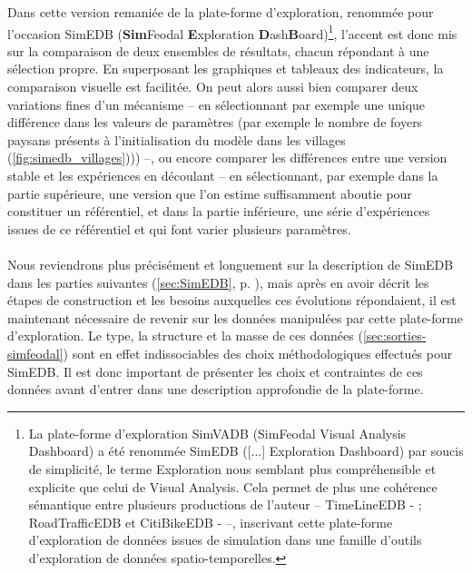 	Dans cette version remaniée de la plate-forme d'exploration, renommée pour l'occasion SimEDB\label{par:introduction-nom-simedb} (\textbf{Sim}Feodal \textbf{E}xploration \textbf{D}ash\textbf{B}oard)\footnote{\label{ftn:origine-simedb}
		La plate-forme d'exploration SimVADB (SimFeodal Visual Analysis Dashboard) a été renommée SimEDB ([...] Exploration Dashboard) par soucis de simplicité, le terme \og Exploration\fg{} nous semblant plus compréhensible et explicite que celui de Visual Analysis. Cela permet de plus une cohérence sémantique entre plusieurs productions de l'auteur -- TimeLineEDB - \autocite{cura_timelineedb_2017}; RoadTrafficEDB et CitiBikeEDB - \autocite{cura_making_2017} --, inscrivant cette plate-forme d'exploration de données issues de simulation dans une \og famille \fg{} d'outils d'exploration de données spatio-temporelles.
	}, l'accent est donc mis sur la comparaison de deux ensembles de résultats, chacun répondant à une sélection propre.
	En superposant les graphiques et tableaux des indicateurs, la comparaison visuelle est facilitée.
	On peut alors aussi bien comparer deux variations fines d'un mécanisme -- en sélectionnant par exemple une unique différence dans les valeurs de paramètres (par exemple le nombre de foyers paysans présents à l'initialisation du modèle dans les villages (\cref{fig:simedb_villages}))) --, ou encore comparer les différences entre une version stable et les expériences en découlant -- en sélectionnant, par exemple dans la partie supérieure, une version que l'on estime suffisamment aboutie pour constituer un référentiel, et dans la partie inférieure, une série d'expériences issues de ce référentiel et qui font varier plusieurs paramètres.


	\paragraph*{}
	Nous reviendrons plus précisément et longuement sur la description de SimEDB dans les parties suivantes (\cref{sec:SimEDB}, p. \pageref{sec:SimEDB}), mais après en avoir décrit les étapes de construction et les besoins auxquelles ces évolutions répondaient, il est maintenant nécessaire de revenir sur les données manipulées par cette plate-forme d'exploration.
	Le type, la structure et la masse de ces données (\cref{sec:sorties-simfeodal}) sont en effet indissociables des choix méthodologiques effectués pour SimEDB.
	Il est donc important de présenter les choix et contraintes de ces données avant d'entrer dans une description approfondie de la plate-forme.
